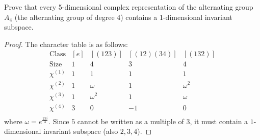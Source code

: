 \begin{prob}[F2007-Q5]
    Prove that every 5-dimensional complex representation of the alternating group \( A_4 \) (the alternating group of degree 4) contains a 1-dimensional invariant subspace.
\end{prob}
\begin{proof}
    The character table is as follows:
    \begin{equation*}
        \begin{array}{c|cccc}
            \text{Class} & [e] & [(123)] & [(12)(34)] & [(132)] \\
            \text{Size} & 1 & 4 & 3 & 4 \\
            \hline
            \chi^{(1)} & 1 & 1 & 1 & 1 \\
            \chi^{(2)} & 1 & \omega & 1 & \omega^2 \\
            \chi^{(3)} & 1 & \omega^2 & 1 & \omega \\
            \chi^{(4)} & 3 & 0 & -1 & 0 \\
            \end{array}
    \end{equation*}
    where $\omega=e^\frac{2\pi i}{3}$. Since $5$ cannot be written as a multiple of $3$, it must contain a $1$-dimensional invariant subspace (also $2,3,4$).
\end{proof}






